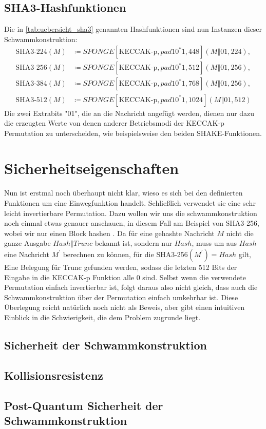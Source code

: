 \subsection{SHA3-Hashfunktionen}
Die in \ref{tab:uebersicht_sha3} genannten Hashfunktionen sind nun Instanzen dieser Schwammkonstruktion:
\begin{align*}
	\text{SHA3-224}(M) & \coloneq SPONGE[\text{KECCAK-p},pad10^*1, 448](M \mathbin\Vert 01, 224), \\
	\text{SHA3-256}(M) & \coloneq SPONGE[\text{KECCAK-p},pad10^*1, 512](M \mathbin\Vert 01, 256), \\
	\text{SHA3-384}(M) & \coloneq SPONGE[\text{KECCAK-p},pad10^*1, 768](M \mathbin\Vert 01, 256), \\
	\text{SHA3-512}(M) & \coloneq SPONGE[\text{KECCAK-p},pad10^*1,1024](M \mathbin\Vert 01, 512)
\end{align*}
Die zwei Extrabits "01", die an die Nachricht angefügt werden,
dienen nur dazu die erzeugten Werte von denen anderer Betriebsmodi der KECCAK-p Permutation zu unterscheiden,
wie beispielsweise den beiden SHAKE-Funktionen.

\section{Sicherheitseigenschaften}
Nun ist erstmal noch überhaupt nicht klar, wieso es sich bei den  definierten Funktionen um eine Einwegfunktion handelt.
Schließlich verwendet sie eine sehr leicht invertierbare Permutation. Dazu wollen wir uns die schwammkonstruktion noch einmal etwas genauer anschauen,
in diesem Fall am Beispiel von SHA3-256, wobei wir nur einen Block hashen .
Da für eine gehashte Nachricht $M$ nicht die ganze Ausgabe $Hash \mathbin\Vert Trunc$ bekannt ist, sondern nur $Hash$,
muss um aus $Hash$ eine Nachricht $M^\prime$ berechnen zu können, für die  SHA3-256$(M^\prime) = Hash$ gilt,
Eine Belegung für Trunc gefunden werden, sodass die letzten 512 Bits der Eingabe in die KECCAK-p Funktion alle 0 sind.
Selbst wenn die verwendete Permutation einfach invertierbar ist, folgt daraus also nicht gleich, dass auch die Schwammkonstruktion über der Permutation einfach umkehrbar ist.
Diese Überlegung reicht natürlich noch nicht als Beweis, aber gibt einen intuitiven Einblick in die Schwierigkeit, die dem Problem zugrunde liegt.

\subsection{Sicherheit der Schwammkonstruktion}


\subsection{Kollisionsresistenz}

\subsection{Post-Quantum Sicherheit der Schwammkonstruktion}